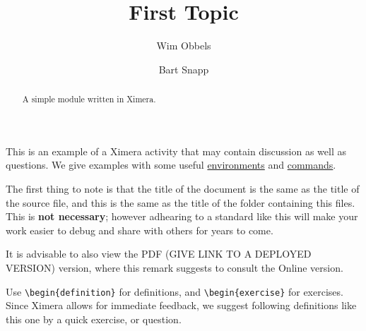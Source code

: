 \documentclass{ximera}
\author{Wim Obbels \and Bart Snapp}
\title{First Topic}
\begin{document}
\begin{abstract}
    A simple module written in Ximera.
\end{abstract}
\maketitle
\label{xim:ximeraDemo}

This is an example of a Ximera activity that may contain discussion as well as
questions. We give examples
with some useful \hyperref[xim:ximeraEnvironments]{environments} and
\hyperref[xim:ximeraCommands]{commands}.

The first thing to note is that the title of the document is the same as the
title of the source file, and this is the same as the title of the folder
containing this files.
This is \textbf{not necessary}; however adhearing to a standard like this will
make your work easier to debug and share with others for years to come.

\begin{onlineOnly}
    \begin{remark}
        It is advisable to also view the PDF (GIVE LINK TO A DEPLOYED VERSION) version, where this remark
        suggests to
        consult the Online version.
    \end{remark}
\end{onlineOnly}







Use \verb|\begin{definition}| for definitions, and \verb|\begin{exercise}| for
exercises. Since Ximera allows for immediate feedback, we suggest following definitions like this one by a quick exercise, or question.
\end{document}
